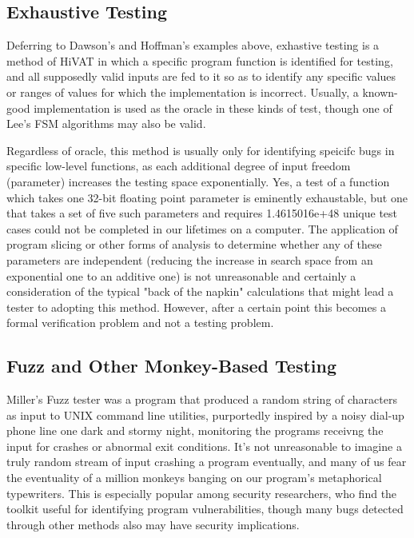 \subsection{Exhaustive Testing}
Deferring to Dawson's and Hoffman's examples above, exhastive testing is a method of HiVAT in which a specific program function is identified for testing, and all supposedly valid inputs are fed to it so as to identify any specific values or ranges of values for which the implementation is incorrect. Usually, a known-good implementation is used as the oracle in these kinds of test, though one of Lee's FSM algorithms may also be valid.

Regardless of oracle, this method is usually only for identifying speicifc bugs in specific low-level functions, as each additional degree of input freedom (parameter) increases the testing space exponentially. Yes, a test of a function which takes one 32-bit floating point parameter is eminently exhaustable, but one that takes a set of five such parameters and requires 1.4615016e+48 unique test cases could not be completed in our lifetimes on a computer. The application of program slicing \citep{gallagher1991using} or other forms of analysis to determine whether any of these parameters are independent (reducing the increase in search space from an exponential one to an additive one) is not unreasonable and certainly a consideration of the typical "back of the napkin" calculations that might lead a tester to adopting this method. However, after a certain point this becomes a formal verification problem and not a testing problem.

\subsection{Fuzz and Other Monkey-Based Testing}
 Miller's Fuzz tester was a program that produced a random string of characters as input to UNIX command line utilities, purportedly inspired by a noisy dial-up phone line one dark and stormy night, monitoring the programs receivng the input for crashes or abnormal exit conditions. It's not unreasonable to imagine a truly random stream of input crashing a program eventually, and many of us fear the eventuality of a million monkeys banging on our program's metaphorical typewriters. This is especially popular among security researchers, who find the toolkit useful for identifying program vulnerabilities, though many bugs detected through other methods also may have security implications.

